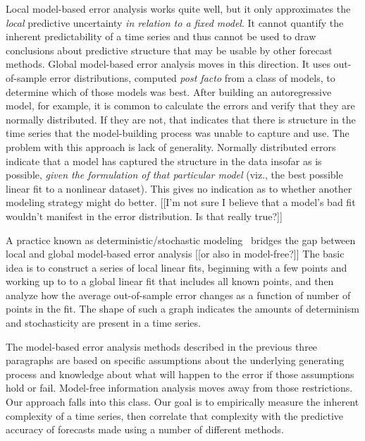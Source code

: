Local model-based error analysis works quite well, but it only
approximates the \emph{local} predictive uncertainty \emph{in relation
  to a fixed model}.  It cannot quantify the inherent predictability
of a time series and thus cannot be used to draw conclusions about
predictive structure that may be usable by other forecast methods.
%
%
Global model-based error analysis moves in this direction.  It uses
out-of-sample error distributions, computed \emph{post facto} from a
class of models, to determine which of those models was best.  After
building an autoregressive model, for example, it is common to
calculate the errors and verify that they are normally distributed.
If they are not, that indicates that there is structure in the time
series that the model-building process was unable to capture and use.
The problem with this approach is lack of generality.  Normally
distributed errors indicate that a model has captured the structure in
the data insofar as is possible, \emph{given the formulation of that
  particular model} (viz., the best possible linear fit to a nonlinear
dataset).  This gives no indication as to whether another modeling
strategy might do better.  {\color{red} [[I'm not sure I believe that
      a model's bad fit wouldn't manifest in the error distribution.
      Is that really true?]]}

A practice known as deterministic/sto\-chas\-tic
modeling~\cite{Casdagli92dvsplots, weigend-book} bridges the gap
between local and global model-based error analysis {\color{red} [[or
      also in model-free?]]}  The basic idea is to construct a series
of local linear fits, beginning with a few points and working up to to
a global linear fit that includes all known points, and then analyze
how the average out-of-sample error changes as a function of number of
points in the fit. The shape of such a graph indicates the amounts of
determinism and stochasticity are present in a time series.

The model-based error analysis methods described in the previous three
paragraphs are based on specific assumptions about the underlying
generating process and knowledge about what will happen to the error
if those assumptions hold or fail.  Model-free information analysis
moves away from those restrictions.  Our approach falls into this
class.  Our goal is to empirically measure the inherent complexity of
a time series, then correlate that complexity with the predictive
accuracy of forecasts made using a number of different methods.  

